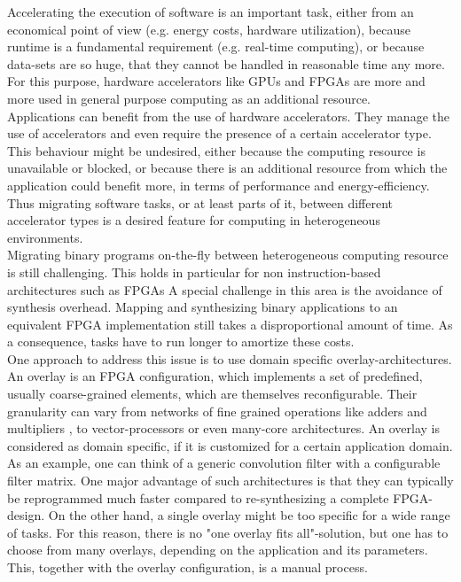 Accelerating the execution of software is an important task, either from an economical point of view (e.g. energy costs, hardware utilization), because runtime is a fundamental requirement (e.g. real-time computing), or because data-sets are so huge, that they cannot be handled in reasonable time any more. For this purpose, hardware accelerators like GPUs and FPGAs are more and more used in general purpose computing as an additional resource.
\\

Applications can benefit from the use of hardware accelerators. They manage the use of accelerators and even require the presence of a certain accelerator type. This behaviour might be undesired, either because the computing resource is unavailable or blocked, or because there is an additional resource from which the application could benefit more, in terms of performance and energy-efficiency. Thus migrating software tasks, or at least parts of it, between different accelerator types is a desired feature for computing in heterogeneous environments.
\\

Migrating binary programs on-the-fly between heterogeneous computing resource is still challenging. This holds in particular for non instruction-based architectures such as FPGAs
A special challenge in this area is the avoidance of synthesis overhead. Mapping and synthesizing binary applications to an equivalent FPGA implementation still takes a disproportional amount of time. As a consequence, tasks have to run longer to amortize these costs.
\\

One approach to address this issue is to use domain specific overlay-architectures. An overlay is an FPGA configuration, which implements a set of predefined, usually coarse-grained elements, which are themselves reconfigurable. Their granularity can vary from networks of fine grained operations like adders and multipliers %
, to vector-processors
or even many-core 
architectures. An overlay is considered as domain specific, if it is customized for a certain application domain. As an example, one can think of a generic convolution filter with a configurable filter matrix. One major advantage of such architectures is that they can typically be reprogrammed much faster compared to re-synthesizing a complete FPGA-design. On the other hand, a single overlay might be too specific for a wide range of tasks. For this reason, there is no "one overlay fits all"-solution, but one has to choose from many overlays, depending on the application and its parameters. This, together with the overlay configuration, is a manual process.
